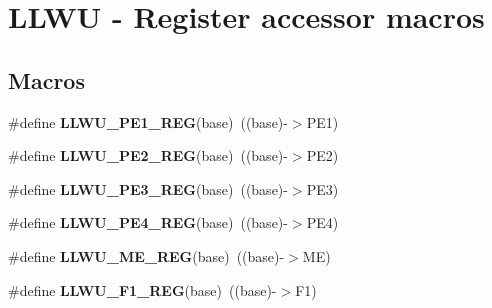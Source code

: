 \hypertarget{group___l_l_w_u___register___accessor___macros}{}\section{L\+L\+WU -\/ Register accessor macros}
\label{group___l_l_w_u___register___accessor___macros}
\subsection*{Macros}
\begin{DoxyCompactItemize}
\item 
\mbox{\label{group___l_l_w_u___register___accessor___macros_gac122d2548e2c00069618b75fc2dda5da}} 
\#define {\bfseries L\+L\+W\+U\+\_\+\+P\+E1\+\_\+\+R\+EG}(base)~((base)-\/$>$P\+E1)
\item 
\mbox{\label{group___l_l_w_u___register___accessor___macros_ga5202d127ca8b88f5920c93ebbb9b9144}} 
\#define {\bfseries L\+L\+W\+U\+\_\+\+P\+E2\+\_\+\+R\+EG}(base)~((base)-\/$>$P\+E2)
\item 
\mbox{\label{group___l_l_w_u___register___accessor___macros_ga31faa7fe2240e17d24eef3748a994673}} 
\#define {\bfseries L\+L\+W\+U\+\_\+\+P\+E3\+\_\+\+R\+EG}(base)~((base)-\/$>$P\+E3)
\item 
\mbox{\label{group___l_l_w_u___register___accessor___macros_gabae264ac23ea3d486f55e8934a91df70}} 
\#define {\bfseries L\+L\+W\+U\+\_\+\+P\+E4\+\_\+\+R\+EG}(base)~((base)-\/$>$P\+E4)
\item 
\mbox{\label{group___l_l_w_u___register___accessor___macros_ga5e41f250b27a820d46d083915e94f18f}} 
\#define {\bfseries L\+L\+W\+U\+\_\+\+M\+E\+\_\+\+R\+EG}(base)~((base)-\/$>$ME)
\item 
\mbox{\label{group___l_l_w_u___register___accessor___macros_ga5f542b8bcaf97360c66a00993f229242}} 
\#define {\bfseries L\+L\+W\+U\+\_\+\+F1\+\_\+\+R\+EG}(base)~((base)-\/$>$F1)
\item 

\end{DoxyCompactItemize}
